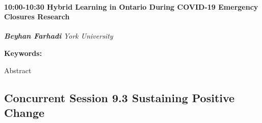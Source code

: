 \documentclass[
]{book}
\begin{document}
\begin{session}
\hypertarget{hybrid-learning-in-ontario-during-covid-19-emergency-closures-research}{%
\paragraph*{\texorpdfstring{10:00-10:30 \textbar{} \textbf{Hybrid
Learning in Ontario During COVID-19 Emergency Closures} \textbar{}
Research}{10:00-10:30 \textbar{} Hybrid Learning in Ontario During COVID-19 Emergency Closures \textbar{} Research}}\label{hybrid-learning-in-ontario-during-covid-19-emergency-closures-research}}

\textbf{\emph{Beyhan Farhadi}} \textbar{} \emph{York University}

\textbf{Keywords:}

Abstract
\end{session}

\hypertarget{concurrent-session-9.3-sustaining-positive-change}{%
\subsection*{Concurrent Session 9.3 \textbar{} Sustaining Positive Change}\label{concurrent-session-9.3-sustaining-positive-change}}
\end{document}
